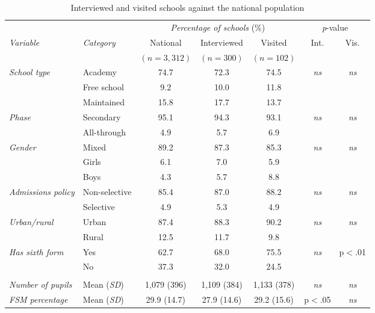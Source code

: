 \begin{table}[htbp]
\centering
\caption{Interviewed and visited schools against the national population}
\label{tab:2A:representativeness}
\small
\footnotesize\setlength{\tabcolsep}{4pt}%
\begin{tabular}{ll ccc cc}
\toprule
 & & \multicolumn{3}{c}{\textit{Percentage of schools} (\%)} & \multicolumn{2}{c}{\textit{p}-value} \\
\cmidrule(lr){3-5} \cmidrule(lr){6-7}
\textit{Variable} & \textit{Category} & National & Interviewed & Visited & Int. & Vis. \\
 & & $(n=3{,}312)$ & $(n=300)$ & $(n=102)$ & & \\
\midrule
  \textit{School type} & Academy & 74.7 & 72.3 & 74.5 & \textit{ns} & \textit{ns} \\
   & Free school & 9.2 & 10.0 & 11.8 &  &  \\
   & Maintained & 15.8 & 17.7 & 13.7 &  &  \\
\addlinespace[3pt]
  \textit{Phase} & Secondary & 95.1 & 94.3 & 93.1 & \textit{ns} & \textit{ns} \\
   & All-through & 4.9 & 5.7 & 6.9 &  &  \\
\addlinespace[3pt]
  \textit{Gender} & Mixed & 89.2 & 87.3 & 85.3 & \textit{ns} & \textit{ns} \\
   & Girls & 6.1 & 7.0 & 5.9 &  &  \\
   & Boys & 4.3 & 5.7 & 8.8 &  &  \\
\addlinespace[3pt]
  \textit{Admissions policy} & Non-selective & 85.4 & 87.0 & 88.2 & \textit{ns} & \textit{ns} \\
   & Selective & 4.9 & 5.3 & 4.9 &  &  \\
\addlinespace[3pt]
  \textit{Urban/rural} & Urban & 87.4 & 88.3 & 90.2 & \textit{ns} & \textit{ns} \\
   & Rural & 12.5 & 11.7 & 9.8 &  &  \\
\addlinespace[3pt]
  \textit{Has sixth form} & Yes & 62.7 & 68.0 & 75.5 & \textit{ns} & p$<$.01 \\
   & No & 37.3 & 32.0 & 24.5 &  &  \\
\addlinespace[4pt]
\multicolumn{7}{l}{\textit{Continuous variables}} \\
\addlinespace[2pt]
  \textit{Number of pupils} & Mean (\textit{SD}) & 1{,}079 (396) & 1{,}109 (384) & 1{,}133 (378) & \textit{ns} & \textit{ns} \\
  \textit{FSM percentage} & Mean (\textit{SD}) & 29.9 (14.7) & 27.9 (14.6) & 29.2 (15.6) & p$<$.05 & \textit{ns} \\

\end{tabular}
\end{table}

